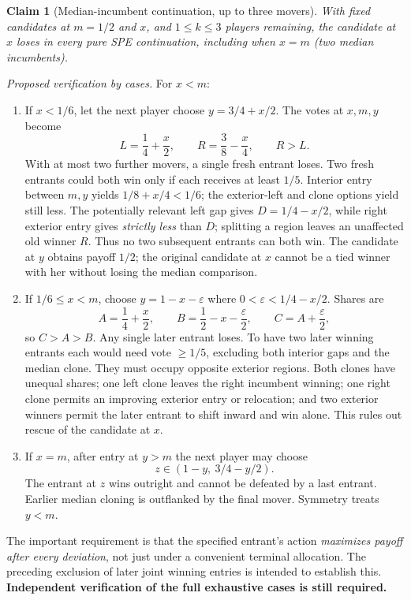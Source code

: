 \documentclass[10pt]{article}
\newtheorem{claim}{Claim}
\begin{document}
\begin{claim}[Median-incumbent continuation, up to three movers]\label{cl:median5}
With fixed candidates at $m=1/2$ and $x$, and $1\le k\le3$ players remaining, the candidate at $x$ loses in \emph{every} pure SPE continuation, including when $x=m$ (two median incumbents).
\end{claim}
\noindent\emph{Proposed verification by cases.} For $x<m$:
\begin{enumerate}[label=(\alph*)]
\item If $x<1/6$, let the next player choose $y=3/4+x/2$. The votes at $x,m,y$ become
\[
 L=\frac14+\frac x2,\qquad R=\frac38-\frac x4,\qquad R>L.
\]
With at most two further movers, a single fresh entrant loses. Two fresh entrants could both win only if each receives at least $1/5$. Interior entry between $m,y$ yields $1/8+x/4<1/6$; the exterior-left and clone options yield still less. The potentially relevant left gap gives $D=1/4-x/2$, while right exterior entry gives \emph{strictly less} than $D$; splitting a region leaves an unaffected old winner $R$. Thus no two subsequent entrants can both win. The candidate at $y$ obtains payoff $1/2$; the original candidate at $x$ cannot be a tied winner with her without losing the median comparison.
\item If $1/6\le x<m$, choose $y=1-x-\varepsilon$ where $0<\varepsilon<1/4-x/2$. Shares are
\[
 A=\frac14+\frac x2,\qquad B=\frac12-x-\frac\varepsilon2,\qquad C=A+\frac\varepsilon2,
\]
so $C>A>B$. Any single later entrant loses. To have two later winning entrants each would need vote $\ge1/5$, excluding both interior gaps and the median clone. They must occupy opposite exterior regions. Both clones have unequal shares; one left clone leaves the right incumbent winning; one right clone permits an improving exterior entry or relocation; and two exterior winners permit the later entrant to shift inward and win alone. This rules out rescue of the candidate at $x$.
\item If $x=m$, after entry at $y>m$ the next player may choose
\[
 z\in(1-y,\ 3/4-y/2).
\]
The entrant at $z$ wins outright and cannot be defeated by a last entrant. Earlier median cloning is outflanked by the final mover. Symmetry treats $y<m$.
\end{enumerate}
The important requirement is that the specified entrant's action \emph{maximizes payoff after every deviation}, not just under a convenient terminal allocation. The preceding exclusion of later joint winning entries is intended to establish this. \textbf{Independent verification of the full exhaustive cases is still required.}
\end{document}
